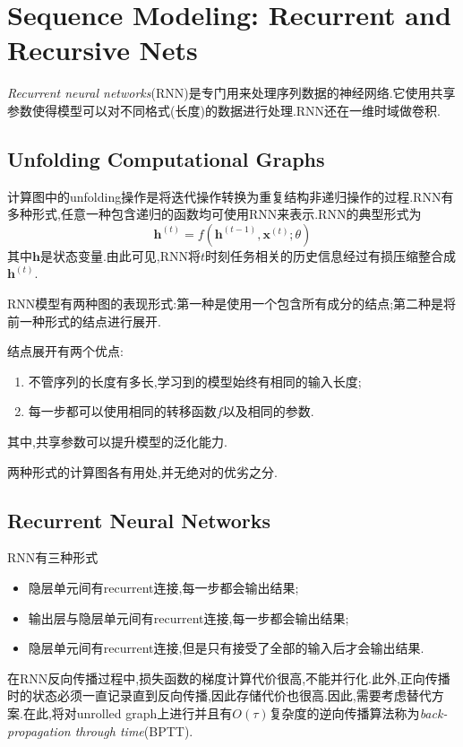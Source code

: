\chapter{Sequence Modeling: Recurrent and Recursive Nets}

\textit{Recurrent neural networks}(RNN)是专门用来处理序列数据的神经网络.它使用共享参数使得模型可以对不同格式(长度)的数据进行处理.RNN还在一维时域做卷积.

\section{Unfolding Computational Graphs}

计算图中的unfolding操作是将迭代操作转换为重复结构非递归操作的过程.RNN有多种形式,任意一种包含递归的函数均可使用RNN来表示.RNN的典型形式为
\begin{equation}
\mathbf h^{(t)}=f(\mathbf h^{(t-1)}, \mathbf x^{(t)};\theta)
\end{equation}
其中$\mathbf h$是状态变量.由此可见,RNN将$t$时刻任务相关的历史信息经过有损压缩整合成$\mathbf h^{(t)}$.

RNN模型有两种图的表现形式:第一种是使用一个包含所有成分的结点;第二种是将前一种形式的结点进行展开.

结点展开有两个优点:
\begin{enumerate}
    \item 不管序列的长度有多长,学习到的模型始终有相同的输入长度;
    \item 每一步都可以使用相同的转移函数$f$以及相同的参数.
\end{enumerate}
其中,共享参数可以提升模型的泛化能力.

两种形式的计算图各有用处,并无绝对的优劣之分.

\section{Recurrent Neural Networks}

RNN有三种形式
\begin{itemize}
    \item 隐层单元间有recurrent连接,每一步都会输出结果;
    \item 输出层与隐层单元间有recurrent连接,每一步都会输出结果;
    \item 隐层单元间有recurrent连接,但是只有接受了全部的输入后才会输出结果.
\end{itemize}

在RNN反向传播过程中,损失函数的梯度计算代价很高,不能并行化.此外,正向传播时的状态必须一直记录直到反向传播,因此存储代价也很高.因此,需要考虑替代方案.在此,将对unrolled graph上进行并且有$O(\tau)$复杂度的逆向传播算法称为\textit{back-propagation through time}(BPTT).


